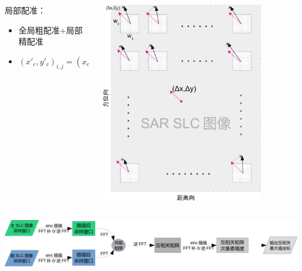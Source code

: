 \documentclass{beamer}
\begin{document}
\begin{frame}
\begin{columns}
\begin{column}{0.5\textwidth}
            局部配准：
            \begin{itemize}
                \item 全局粗配准+局部精配准\\
                \item \tiny $ (x'_c, y'_c)_{i,j} = (x_c, y_c)_{i,j} + (\Delta_x, \Delta_y) + (\delta_x, \delta_y)_{i,j} $
            \end{itemize}
        \end{column}
        \begin{column}{0.5\textwidth}
            \includegraphics[width=0.80\textwidth]{figures/register.pdf}
        \end{column}
    \end{columns}

    \centering
    \includegraphics[width=0.99\textwidth]{figures/xcorr-crop.pdf}
\end{frame}
\end{document}
